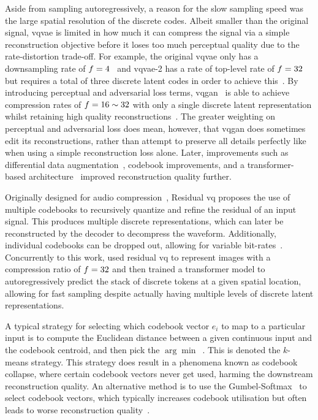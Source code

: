 Aside from sampling autoregressively, a reason for the slow sampling speed was
the large spatial resolution of the discrete codes. Albeit smaller than the
original signal, \gls{vqvae} is limited in how much it can compress the signal
via a simple reconstruction objective before it loses too much perceptual
quality due to the rate-distortion trade-off. For example, the original
\gls{vqvae} only has a downsampling rate of
$f=4$~\cite{oord2017vqvae} and \gls{vqvae}-2 has a rate of
top-level rate of $f=32$ but requires a total of three discrete
latent codes in order to achieve this~\cite{razavi2019generating}. By
introducing perceptual and adversarial loss terms,
\gls{vqgan}~\cite{esser2021taming} is able to achieve compression rates of
$f=16 \sim 32$ with only a single discrete latent representation
whilst retaining high quality reconstructions~\cite{esser2021taming}. The
greater weighting on perceptual and adversarial loss does mean, however, that
\gls{vqgan} does sometimes edit its reconstructions, rather than attempt to
preserve all details perfectly like when using a simple reconstruction loss
alone. Later, improvements such as differential data
augmentation~\cite{bondtaylor2021unleashing}, codebook improvements, and a
transformer-based architecture~\cite{yu2021vqgan} improved reconstruction
quality further.

Originally designed for audio compression~\cite{zeghidour2021soundstream},
Residual \gls{vq} proposes the use of multiple codebooks to recursively quantize
and refine the residual of an input signal. This produces multiple discrete
representations, which can later be reconstructed by the decoder to decompress
the waveform. Additionally, individual codebooks can be dropped out, allowing
for variable bit-rates~\cite{zeghidour2021soundstream}. Concurrently to this
work, \citet{lee2022rqvae} used residual \gls{vq} to represent images with a
compression ratio of $f=32$ and then trained a transformer model
to autoregressively predict the stack of discrete tokens at a given spatial
location, allowing for fast sampling despite actually having multiple levels of
discrete latent representations\cite{lee2022rqvae}.

A typical strategy for selecting which codebook vector $e_i$ to map to a
particular input is to compute the Euclidean distance between a given continuous
input and the codebook centroid, and then pick the
$\arg\min$~\cite{oord2017vqvae}. This is denoted the $k$-means strategy. This
strategy does result in a phenomena known as codebook collapse, where certain
codebook vectors never get used, harming the downstream reconstruction quality.
An alternative method is to use the Gumbel-Softmax~\cite{jang2016gumbel} to
select codebook vectors, which typically increases codebook utilisation but
often leads to worse reconstruction quality~\cite{bondtaylor2021unleashing}.


